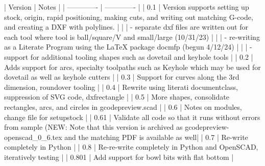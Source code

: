 \documentclass{ltxdoc}
\begin{document}
\begin{readme}
| Version       | Notes         |
| ------------- | ------------- |
| 0.1           | Version  supports setting up stock, origin, rapid positioning, making cuts, and writing out matching G-code, and creating a DXF with polylines.                                 |
|               |  - separate dxf files are written out for each tool where tool is ball/square/V and small/large (10/31/23)                                                                      |
|               |  - re-writing as a Literate Program using the LaTeX package docmfp (begun 4/12/24)                                                                                              |
|               |  - support for additional tooling shapes such as dovetail and keyhole tools                                                                                                     |
| 0.2           | Adds support for arcs, specialty toolpaths such as Keyhole which may be used for dovetail as well as keyhole cutters                                                            |
| 0.3           | Support for curves along the 3rd dimension, roundover tooling                                                                                                                   |
| 0.4           | Rewrite using literati documentclass, suppression of SVG code, dxfrectangle                                                                                                     |
| 0.5           | More shapes, consolidate rectangles, arcs, and circles in gcodepreview.scad                                                                                                     |
| 0.6           | Notes on modules, change file for setupstock                                                                                                                                    |
| 0.61          | Validate all code so that it runs without errors from sample (NEW: Note that this version is archived as gcodepreview-openscad_0_6.tex and the matching PDF is available as well|
| 0.7           | Re-write completely in Python                                                                                                                                                   |
| 0.8           | Re-re-write completely in Python and OpenSCAD, iteratively testing                                                                                                              |
| 0.801         | Add support for bowl bits with flat bottom                                                                                                                                      |

\end{readme}
\end{document}

